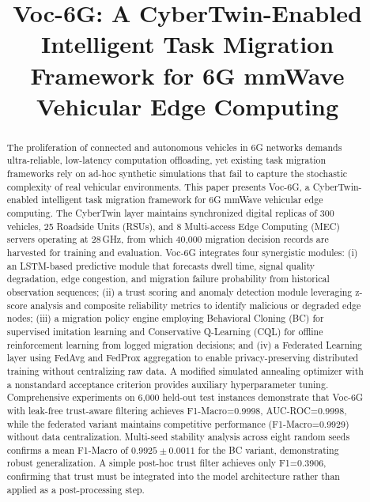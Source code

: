 \documentclass[journal,twoside]{IEEEtran}
\newcommand{\VocSixG}{Voc-6G}
\begin{document}
\title{Voc-6G: A CyberTwin-Enabled Intelligent Task Migration Framework for 6G mmWave Vehicular Edge Computing}

\author{
}


\maketitle

\begin{abstract}
The proliferation of connected and autonomous vehicles in 6G networks demands ultra-reliable, low-latency computation offloading, yet existing task migration frameworks rely on ad-hoc synthetic simulations that fail to capture the stochastic complexity of real vehicular environments. This paper presents \VocSixG{}, a CyberTwin-enabled intelligent task migration framework for 6G mmWave vehicular edge computing. The CyberTwin layer maintains synchronized digital replicas of 300 vehicles, 25 Roadside Units (RSUs), and 8 Multi-access Edge Computing (MEC) servers operating at 28\,GHz, from which 40,000 migration decision records are harvested for training and evaluation. \VocSixG{} integrates four synergistic modules: (i) an LSTM-based predictive module that forecasts dwell time, signal quality degradation, edge congestion, and migration failure probability from historical observation sequences; (ii) a trust scoring and anomaly detection module leveraging z-score analysis and composite reliability metrics to identify malicious or degraded edge nodes; (iii) a migration policy engine employing Behavioral Cloning (BC) for supervised imitation learning and Conservative Q-Learning (CQL) for offline reinforcement learning from logged migration decisions; and (iv) a Federated Learning layer using FedAvg and FedProx aggregation to enable privacy-preserving distributed training without centralizing raw data. A modified simulated annealing optimizer with a nonstandard acceptance criterion provides auxiliary hyperparameter tuning. Comprehensive experiments on 6,000 held-out test instances demonstrate that \VocSixG{} with leak-free trust-aware filtering achieves F1-Macro=0.9998, AUC-ROC=0.9998, while the federated variant maintains competitive performance (F1-Macro=0.9929) without data centralization. Multi-seed stability analysis across eight random seeds confirms a mean F1-Macro of $0.9925 \pm 0.0011$ for the BC variant, demonstrating robust generalization. A simple post-hoc trust filter achieves only F1=0.3906, confirming that trust must be integrated into the model architecture rather than applied as a post-processing step.\footnotemark
\end{abstract}
\end{document}
